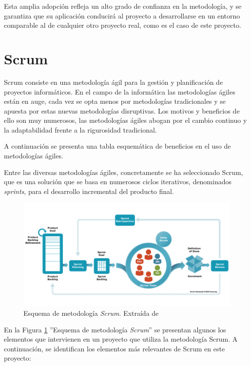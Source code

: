 Esta amplia adopción refleja un alto grado de confianza en la metodología, y se garantiza que su aplicación conducirá al proyecto a desarrollarse en un entorno comparable al de cualquier otro proyecto real, como es el caso de este proyecto.

\section{Scrum} \label{sec:04crum} %

Scrum \cite{scrumWebsite} consiste en una metodología ágil para la gestión y planificación de proyectos informáticos. En el campo de la informática las metodologías ágiles están en auge, cada vez se opta menos por metodologías tradicionales y se apuesta por estas nuevas metodologías disruptivas. Los motivos y beneficios de ello son muy numerosos, las metodologías ágiles abogan por el cambio continuo y la adaptabilidad frente a la rigurosidad tradicional. 

A continuación se presenta una tabla esquemática de beneficios en el uso de metodologías ágiles.



Entre las diversas metodologías ágiles, concretamente se ha seleccionado Scrum, que es una solución que se basa en numerosos ciclos iterativos, denominados \textit{sprints}, para el desarrollo incremental del producto final.

\begin{figure}[H]
    \centering
    \includegraphics[width=1\textwidth]{figures/scrumFramework.png}
     \caption{Esquema de metodología \textit{Scrum}. Extraída de \cite{scrumWebsite}}
    \label{fig:scrumFramework}
\end{figure}

En la Figura \ref{fig:scrumFramework} ''Esquema de metodología \textit{Scrum}'' se presentan algunos los elementos que intervienen en un proyecto que utiliza la metodología Scrum. A continuación, se identifican los elementos más relevantes de Scrum en este proyecto:

